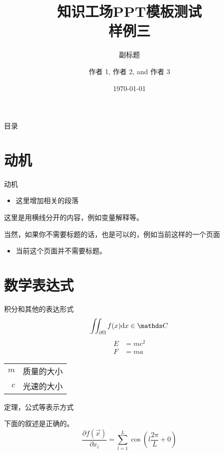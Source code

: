 \documentclass{kw}
\title[副标题]{知识工场PPT模板测试\\样例三}
\subtitle{副标题}
\author{作者 1\inst{1}, 作者 2\inst{1}, and 作者 3\inst{2}}
\institute[]{%
	\inst{1} 复旦大学知识工场实验室\\
	\inst{2} 复旦大学计算机科学与技术学院
}
\date{\today} %
\begin{document}
\begin{frame}[plain]
	\titlepage
\end{frame}

\begin{frame}{目录}
	\tableofcontents %
\end{frame}

\section{动机}
\begin{frame}{动机}
	\begin{itemize}
		\item 这里增加相关的段落
	\end{itemize}
	
	\seprule
	
	这里是用横线分开的内容，例如变量解释等。
\end{frame}
\begin{frame}
	当然，如果你不需要标题的话，也是可以的，例如当前这样的一个页面
	\begin{itemize}
		\item 当前这个页面并不需要标题。
	\end{itemize}
\end{frame}

\section{数学表达式}
\begin{frame}{积分和其他的表达形式}
	\begin{equation}
		\iint_{\partial\Omega}f(x)\diff{x} \in \complexes
	\end{equation}
	\begin{align}
		E &= mc^2\\
		F &= ma
	\end{align}

	\seprule
	
	\begin{tabular}{rl}
		$m$ & 质量的大小\\
		$c$ & 光速的大小
	\end{tabular}
\end{frame}
\begin{frame}{定理，公式等表示方式}
	\begin{theorem}
		下面的叙述是正确的。
		\begin{equation}
			\frac{\partial f(\vec{x})}{\partial x_i} = \sum_{l=1}^{L}\cos\left(l\frac{2\pi}{L} + 0\right)
		\end{equation}
	\end{theorem}
\end{frame}
\end{document}
